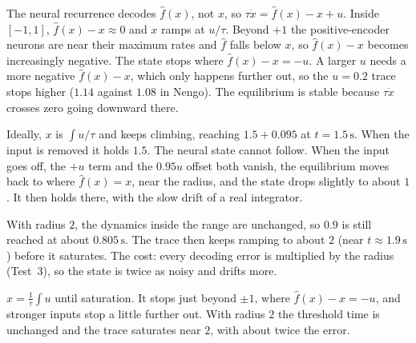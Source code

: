 \documentclass[11pt,letterpaper]{article}
\newcommand{\ans}[1]{\par\vspace{4pt}{\bfseries #1}\quad}
\begin{document}
The neural recurrence decodes $\hat f(x)$, not $x$, so $\tau\dot x = \hat f(x) - x + u$. Inside $[-1, 1]$, $\hat f(x) - x \approx 0$ and $x$ ramps at $u/\tau$. Beyond $+1$ the positive-encoder neurons are near their maximum rates and $\hat f$ falls below $x$, so $\hat f(x) - x$ becomes increasingly negative. The state stops where $\hat f(x) - x = -u$. A larger $u$ needs a more negative $\hat f(x) - x$, which only happens further out, so the $u = 0.2$ trace stops higher ($1.14$ against $1.08$ in Nengo). The equilibrium is stable because $\tau\dot x$ crosses zero going downward there.
\begin{center}
\end{center}
\ans{Q2}
Ideally, $x$ is $\int u/\tau$ and keeps climbing, reaching $1.5 + 0.095$ at $t = 1.5\,\mathrm{s}$. When the input is removed it holds $1.5$. The neural state cannot follow. When the input goes off, the $+u$ term and the $0.95u$ offset both vanish, the equilibrium moves back to where $\hat f(x) = x$, near the radius, and the state drops slightly to about $1$. It then holds there, with the slow drift of a real integrator.

With radius $2$, the dynamics inside the range are unchanged, so $0.9$ is still reached at about $0.805\,\mathrm{s}$. The trace then keeps ramping to about $2$ (near $t \approx 1.9\,\mathrm{s}$) before it saturates. The cost: every decoding error is multiplied by the radius (Test~3), so the state is twice as noisy and drifts more.
\begin{result}
$x = \frac1\tau\int u$ until saturation. It stops just beyond $\pm1$, where $\hat f(x) - x = -u$, and stronger inputs stop a little further out. With radius $2$ the threshold time is unchanged and the trace saturates near $2$, with about twice the error.
\end{result}
\end{document}
